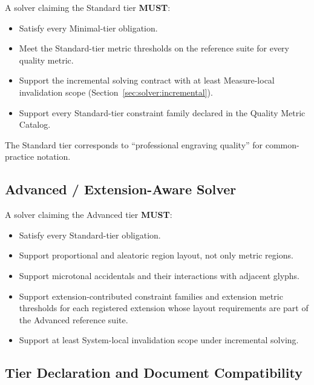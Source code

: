 \documentclass[11pt,letterpaper]{report}
\newcounter{requirement}[chapter]
\newcommand{\MUST}{\textbf{MUST}}
\begin{document}
\begin{requirement}
  \label{req:solver:standard-tier}
  A solver claiming the Standard tier \MUST{}:

  \begin{itemize}
    \item Satisfy every Minimal-tier obligation.
    \item Meet the Standard-tier metric thresholds on the
      reference suite for every quality metric.
    \item Support the incremental solving contract with at least
      Measure-local invalidation scope
      (Section~\ref{sec:solver:incremental}).
    \item Support every Standard-tier constraint family declared
      in the Quality Metric Catalog.
  \end{itemize}

  The Standard tier corresponds to ``professional engraving
  quality'' for common-practice notation.
\end{requirement}

\subsection{Advanced / Extension-Aware Solver}

\begin{requirement}
  \label{req:solver:advanced-tier}
  A solver claiming the Advanced tier \MUST{}:

  \begin{itemize}
    \item Satisfy every Standard-tier obligation.
    \item Support proportional and aleatoric region layout, not
      only metric regions.
    \item Support microtonal accidentals and their interactions
      with adjacent glyphs.
    \item Support extension-contributed constraint families and
      extension metric thresholds for each registered extension
      whose layout requirements are part of the Advanced
      reference suite.
    \item Support at least System-local invalidation scope
      under incremental solving.
  \end{itemize}
\end{requirement}

\subsection{Tier Declaration and Document Compatibility}
\end{document}
